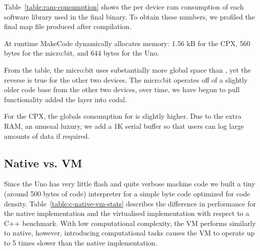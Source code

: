 Table~\ref{table:ram-consumption} shows the per device ram consumption of each software library used in the final \MC binary. To obtain these numbers, we profiled the final map file produced after compilation.

At runtime MakeCode dynamically allocates memory: 1.56 kB for the CPX, 560 bytes for the micro:bit, and 644 bytes for the Uno.

From the table, the micro:bit uses substantially more global space than \CO, yet the reverse is true for the other two devices. The micro:bit operates off of a slightly older code base from the other two devices, over time, we have begun to pull functionality added the \MC layer into codal.

For the CPX, the globals consumption for \CO is slightly higher. Due to the extra RAM, an unusual luxury, we add a 1K serial buffer so that users can log large amounts of data if required.




\subsection{\MC Native vs. \MC VM}

Since the Uno has very little flash and quite verbose machine code we built a
tiny (around 500 bytes of code) interpreter for a simple byte code optimized
for code density.
Table~\ref{table:c-native-vm-stats} describes the difference in performance for the native implementation and the virtualised implementation with respect to a C++ benchmark. With low computational complexity, the VM performs similarly to native, however, introducing computational tasks causes the VM to operate up to 5 times slower than the native implementation.

